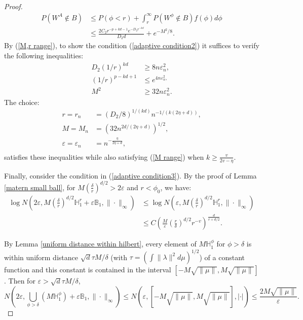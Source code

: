 \documentclass[ejs,noshowframe]{imsart}
\theoremstyle{plain}
\theoremstyle{definition}
\theoremstyle{remark}
\begin{document}
\begin{appendix}
\begin{proof}
\begin{equation}\label{M,r range}
\begin{aligned}
P\left(W^A \notin B\right) & \leq P(\phi<r)+\int_r^\infty P\left(W^{\phi} \notin B\right) f({\phi}) d {\phi} \\
& \leq \frac{2 C_2 r^{-p+kd-1} e^{-D_2 r^{-kd} }}{D_2 d }+e^{-M^2 / 8}.
\end{aligned}
\end{equation}
By   (\ref{M,r range}), to show the condition (\ref{adaptive condition2}) it suffices to verify the following inequalities:
\begin{equation} \label{M range 2}
\begin{aligned}
D_2 (1/r)^{kd} & \geq 8 n \varepsilon_n^2, \\
(1/r)^{p-kd+1} & \leq e^{4 n \varepsilon_n^2,} \\
M^2 & \geq 32 n \varepsilon_n^2.
\end{aligned}
\end{equation}
The choice:
\begin{equation} \label{solution of M,r}
    \begin{aligned}
r=r_n&=({D_2}/{8})^{1/(kd)}n^{-1/(k(2 \eta+d))},\\
M=M_n&=(32n^{{2d}/(2 \eta+d)})^{1/2},\\
\varepsilon=\varepsilon_n&=n^{-\frac{\eta}{2\eta+d}},\\
\end{aligned}
\end{equation}
 satisfies these inequalities while also satisfying (\ref{M range}) when $k \ge \frac{v}{2v-\eta}$.

Finally, consider the condition in  (\ref{adaptive condition3}). By the proof of Lemma \ref{matern small ball}, for $M (\frac{\delta}{r})^{d/2}>2 \varepsilon$ and $r< \phi_0$, we have:
$$
\begin{aligned}
\log N\left(2 \varepsilon, M (\frac{\delta}{r})^{d/2} \mathbb{H}_1^r+\varepsilon \mathbb{B}_1,\|\cdot\|_{\infty}\right) & \leq \log N\left(\varepsilon, M (\frac{\delta}{r})^{d/2} \mathbb{H}_1^r,\|\cdot\|_{\infty}\right) \\
& \leq C \left( \frac{M}{\varepsilon} (\frac{r}{\delta})^{d/2}r^{-v}  \right)^{\frac{d}{v+d/2}} .
\end{aligned}
$$

By Lemma \ref{uniform distance within hilbert}, every element of $M \mathbb{H}_1^{\phi}$ for $\phi>\delta$ is within uniform distance $ \sqrt{d} \tau M/\delta$ (with $\tau=(\int \|\lambda\|^2 d \mu)^{1/2}$) of a constant function and this constant is contained in the interval $[-M \sqrt{\|\mu\|}, M \sqrt{\|\mu\|}]$. Then for $\varepsilon> \sqrt{d} \tau M/\delta$,
$$
N\left(2 \varepsilon, \bigcup_{\phi>\delta}\left(M \mathbb{H}_1^{\phi}\right)+\varepsilon \mathbb{B}_1,\|\cdot\|_{\infty}\right) \leq N(\varepsilon,[-M \sqrt{\|\mu\|}, M \sqrt{\|\mu\|}],|\cdot|) \leq \frac{2 M \sqrt{\|\mu\|}}{\varepsilon} .
$$


\end{proof}
\end{appendix}
\end{document}
